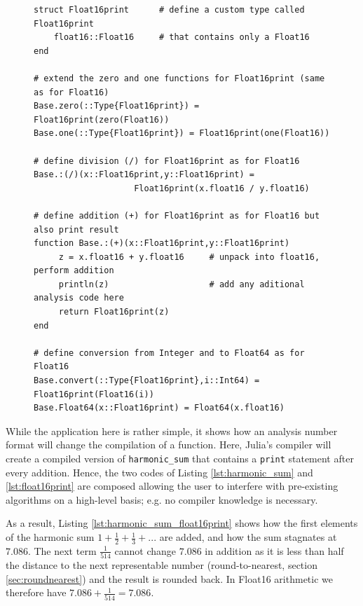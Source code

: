 \begin{figure}[tbhp]
\begin{lstlisting}[language=JuliaLocal, label=lst:float16print, caption={\textbf{Minimal example of the definition of a new custom analysis
number format \texttt{Float16print} in Julia.} The number format behaves like Float16 and defines all operations needed for \texttt{harmonic\_sum}
but the addition also executes the \texttt{print} function that helps to analyse code without changing \texttt{harmonic\_sum} itself.}]
struct Float16print      # define a custom type called Float16print
    float16::Float16     # that contains only a Float16
end

# extend the zero and one functions for Float16print (same as for Float16)
Base.zero(::Type{Float16print}) = Float16print(zero(Float16))
Base.one(::Type{Float16print}) = Float16print(one(Float16))

# define division (/) for Float16print as for Float16
Base.:(/)(x::Float16print,y::Float16print) =
					Float16print(x.float16 / y.float16)

# define addition (+) for Float16print as for Float16 but also print result
function Base.:(+)(x::Float16print,y::Float16print)
     z = x.float16 + y.float16     # unpack into float16, perform addition
     println(z)                    # add any aditional analysis code here
     return Float16print(z)
end

# define conversion from Integer and to Float64 as for Float16
Base.convert(::Type{Float16print},i::Int64) = Float16print(Float16(i))
Base.Float64(x::Float16print) = Float64(x.float16)
\end{lstlisting}
\end{figure}

While the application here is rather simple, it shows how an analysis number format will change the compilation of a function. Here,
Julia's compiler will create a compiled version of \texttt{harmonic\_sum} that contains a \texttt{print} statement after
every addition. Hence, the two codes of Listing \ref{lst:harmonic_sum} and \ref{lst:float16print} are composed allowing the user
to interfere with pre-existing algorithms on a high-level basis; e.g. no compiler knowledge is necessary.

As a result, Listing \ref{lst:harmonic_sum_float16print} shows how the first elements of the harmonic sum $1 + \tfrac{1}{2} + \tfrac{1}{3} + ...$ are added,
and how the sum stagnates at $7.086$. The next term $\tfrac{1}{514}$ cannot change $7.086$ in addition as it is less than half the
distance to the next representable number (round-to-nearest, section \ref{sec:roundnearest}) and the result is rounded back.
In Float16 arithmetic we therefore have $7.086 + \tfrac{1}{514} = 7.086$.

